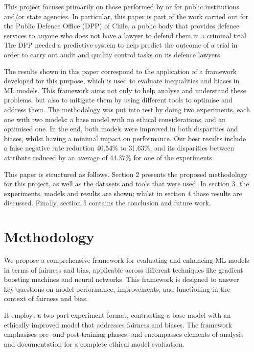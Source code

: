 \documentclass[fleqn,10pt]{wlscirep}
\begin{document}
This project focuses primarily on those performed by or for public institutions and/or state agencies. In particular, this paper is part of the work carried out for the Public Defence Office (DPP) of Chile, a public body that provides defence services to anyone who does not have a lawyer to defend them in a criminal trial. The DPP needed a predictive system to help predict the outcome of a trial in order to carry out audit and quality control tasks on its defence lawyers.

The results shown in this paper correspond to the application of a framework developed for this purpose, which is used to evaluate inequalities and biases in ML models. This framework aims not only to help analyse and understand these problems, but also to mitigate them by using different tools to optimise and address them. The methodology was put into test by doing two experiments, each one with two models: a base model with no ethical considerations, and an optimised one. In the end, both models were improved in both disparities and biases, whilst having a minimal impact on performance. Our best results include a false negative rate reduction 40.54\% to 31.63\%, and its disparities between attribute reduced by an average of 44.37\% for one of the experiments.

This paper is structured as follows. Section 2 presents the proposed methodology for this project, as well as the datasets and tools that were used. In section 3, the experiments, models and results are shown; whilst in section 4 those results are discussed. Finally, section 5 contains the conclusion and future work.


\section{Methodology}
\label{methods}

We propose a comprehensive framework for evaluating and enhancing ML models in terms of fairness and bias, applicable across different techniques like gradient boosting machines and neural networks. This framework is designed to answer key questions on model performance, improvements, and functioning in the context of fairness and bias.

It employs a two-part experiment format, contrasting a base model with an ethically improved model that addresses fairness and biases. The framework emphasises pre- and post-training phases, and encompasses elements of analysis and documentation for a complete ethical model evaluation.
\end{document}

